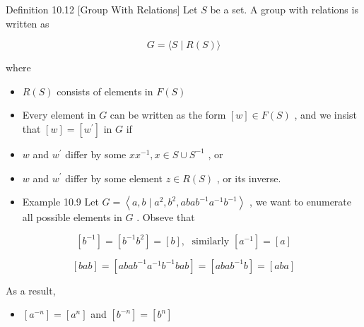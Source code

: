Definition 10.12 [Group With Relations] Let \(S\) be a set. A group with relations is written as

\[
G = \langle S \mid  R\left( S\right) \rangle
\]

where

\begin{itemize}
\item \(R\left( S\right)\) consists of elements in \(F\left( S\right)\)
\end{itemize}

\begin{itemize}
\item Every element in \(G\) can be written as the form \(\left\lbrack  w\right\rbrack   \in  F\left( S\right)\) , and we insist that \(\left\lbrack  w\right\rbrack   = \left\lbrack  {w}^{\prime }\right\rbrack\) in \(G\) if
\end{itemize}

\begin{itemize}
\item \(w\) and \({w}^{\prime }\) differ by some \(x{x}^{-1},x \in  S \cup  {S}^{-1}\) , or
\end{itemize}

\begin{itemize}
\item \(w\) and \({w}^{\prime }\) differ by some element \(z \in  R\left( S\right)\) , or its inverse.
\end{itemize}

\begin{itemize}
\item Example 10.9 Let \(G = \left\langle  {a,b \mid  {a}^{2},{b}^{2},{aba}{b}^{-1}{a}^{-1}{b}^{-1}}\right\rangle\) , we want to enumerate all possible elements in \(G\) . Obseve that
\end{itemize}

\[
\left\lbrack  {b}^{-1}\right\rbrack   = \left\lbrack  {{b}^{-1}{b}^{2}}\right\rbrack   = \left\lbrack  b\right\rbrack  ,\;\text{ similarly }\left\lbrack  {a}^{-1}\right\rbrack   = \left\lbrack  a\right\rbrack
\]

\[
\left\lbrack  {bab}\right\rbrack   = \left\lbrack  {{aba}{b}^{-1}{a}^{-1}{b}^{-1}{bab}}\right\rbrack   = \left\lbrack  {{aba}{b}^{-1}b}\right\rbrack   = \left\lbrack  {aba}\right\rbrack
\]

As a result,

\begin{itemize}
\item \(\left\lbrack  {a}^{-n}\right\rbrack   = \left\lbrack  {a}^{n}\right\rbrack\) and \(\left\lbrack  {b}^{-n}\right\rbrack   = \left\lbrack  {b}^{n}\right\rbrack\)
\end{itemize}

